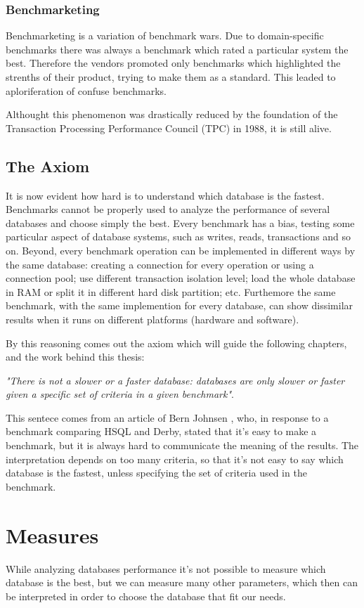 		\subsubsection{Benchmarketing}
Benchmarketing is a variation of benchmark wars. Due to domain-specific benchmarks there was always a benchmark which rated a particular system the best. Therefore the vendors promoted only benchmarks which highlighted the strenths of their product, trying to make them as a standard. This leaded to aploriferation of confuse benchmarks.

Althought this phenomenon was drastically reduced by the foundation of the Transaction Processing Performance Council (TPC) in 1988, it is still alive.
	
		\subsection{The Axiom}
It is now evident how hard is to understand which database is the fastest. Benchmarks cannot be properly used to analyze the performance of several databases and choose simply the best. Every benchmark has a bias, testing some particular aspect of database systems, such as writes, reads, transactions and so on. Beyond, every benchmark operation can be implemented in different ways by the same database: creating a connection for every operation or using a connection pool; use different transaction isolation level; load the whole database in RAM or split it in different hard disk partition; etc. Furthemore the same benchmark, with the same implemention for every database, can show dissimilar results when it runs on different platforms (hardware and software).

By this reasoning comes out the axiom which will guide the following chapters, and the work behind this thesis:

\emph{"There is not a slower or a faster database: databases are only slower or faster given a specific set of criteria in a given benchmark"}.

This sentece comes from an article of Bern Johnsen \cite{Bernt}, who, in response to a benchmark comparing HSQL and Derby, stated that it's easy to make a benchmark, but it is always hard to communicate the meaning of the results. The interpretation depends on too many criteria, so that it's not easy to say which database is the fastest, unless specifying the set of criteria used in the benchmark.
	
		\section{Measures}
While analyzing databases performance it's not possible to measure which database is the best, but we can measure many other parameters, which then can be interpreted in order to choose the database that fit our needs.

